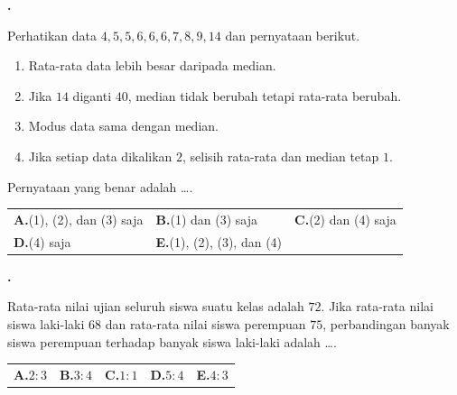 \documentclass[a4paper,11pt]{article}
\newcounter{no}
\newcommand{\soal}[2]{\par\vspace{0.75em}\stepcounter{no}\noindent
  \begin{minipage}[t]{1.8em}\textbf{\theno.}\end{minipage}%
  \begin{minipage}[t]{\dimexpr\linewidth-1.8em\relax}#1\par\vspace{0.35em}#2\end{minipage}\par}
\begin{document}
\soal{Perhatikan data $4,5,5,6,6,6,7,8,9,14$ dan pernyataan berikut.
\begin{enumerate}[label=(\arabic*),leftmargin=1.8em,itemsep=0pt,topsep=2pt]
\item Rata-rata data lebih besar daripada median.
\item Jika $14$ diganti $40$, median tidak berubah tetapi rata-rata berubah.
\item Modus data sama dengan median.
\item Jika setiap data dikalikan $2$, selisih rata-rata dan median tetap $1$.
\end{enumerate}
Pernyataan yang benar adalah \dots.}{\begin{tabularx}{\linewidth}{@{}*{3}{X}@{}}\textbf{A.}\;(1), (2), dan (3) saja & \textbf{B.}\;(1) dan (3) saja & \textbf{C.}\;(2) dan (4) saja\\[3pt] \textbf{D.}\;(4) saja & \textbf{E.}\;(1), (2), (3), dan (4) & \end{tabularx}}
\soal{Rata-rata nilai ujian seluruh siswa suatu kelas adalah $72$. Jika rata-rata nilai siswa laki-laki $68$ dan rata-rata nilai siswa perempuan $75$, perbandingan banyak siswa perempuan terhadap banyak siswa laki-laki adalah \dots.}{\begin{tabularx}{\linewidth}{@{}*{5}{X}@{}}\textbf{A.}\;$2:3$ & \textbf{B.}\;$3:4$ & \textbf{C.}\;$1:1$ & \textbf{D.}\;$5:4$ & \textbf{E.}\;$4:3$\end{tabularx}}
\end{document}
